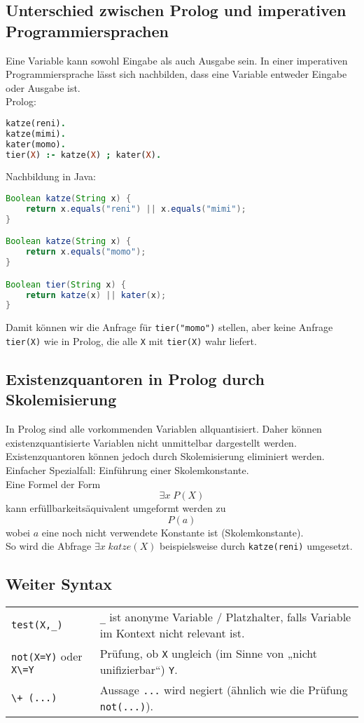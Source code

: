 \subsection{Unterschied zwischen Prolog und imperativen Programmiersprachen}
Eine Variable kann sowohl Eingabe als auch Ausgabe sein. In einer imperativen Programmiersprache lässt sich nachbilden, dass eine Variable entweder Eingabe oder Ausgabe ist.\\
Prolog:
\begin{lstlisting}[language=Prolog]
katze(reni).
katze(mimi).
kater(momo).
tier(X) :- katze(X) ; kater(X).
\end{lstlisting}
Nachbildung in Java:
\begin{lstlisting}[language=Java]
Boolean katze(String x) {
	return x.equals("reni") || x.equals("mimi");
}

Boolean katze(String x) {
	return x.equals("momo");
}

Boolean tier(String x) {
	return katze(x) || kater(x);
}
\end{lstlisting}
Damit können wir die Anfrage für \lstinline$tier("momo")$ stellen, aber keine Anfrage \lstinline$tier(X)$ wie in Prolog, die alle \lstinline$X$ mit \lstinline$tier(X)$ wahr liefert.

\subsection{Existenzquantoren in Prolog durch Skolemisierung}
In Prolog sind alle vorkommenden Variablen allquantisiert. Daher können existenzquantisierte Variablen nicht unmittelbar dargestellt werden. Existenzquantoren können jedoch durch Skolemisierung eliminiert werden. Einfacher Spezialfall: Einführung einer Skolemkonstante.\\
Eine Formel der Form
$$\exists x\; P(X)$$
kann erfüllbarkeitsäquivalent umgeformt werden zu
$$P(a)$$
wobei $a$ eine noch nicht verwendete Konstante ist (Skolemkonstante).\\
So wird die Abfrage $\exists x\; katze(X)$ beispielsweise durch \lstinline$katze(reni)$ umgesetzt.

\subsection{Weiter Syntax}
\begin{tabular}{L{.3} L{.7}}
\lstinline$test(X,_)$ & \lstinline$_$ ist anonyme Variable / Platzhalter, falls Variable im Kontext nicht relevant ist.\\
\lstinline$not(X=Y)$ oder \lstinline$X\=Y$ & Prüfung, ob \lstinline$X$ ungleich (im Sinne von „nicht unifizierbar“) \lstinline$Y$.\\
\lstinline$\+ (...)$ & Aussage \lstinline$...$ wird negiert (ähnlich wie die Prüfung \lstinline$not(...)$).
\end{tabular}

